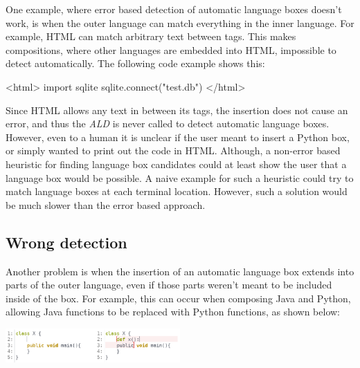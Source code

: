 \documentclass[sigplan,screen]{acmart}\settopmatter{printfolios=true,printccs=false,printacmref=false}
\newcommand{\ald}[0]{\emph{ALD}\xspace}
\begin{document}
One example, where error based detection of automatic language boxes doesn't
work, is when the outer language can match everything in the inner language.
For example, HTML can match arbitrary text between tags. This makes
compositions, where other languages are embedded into HTML, impossible to
detect automatically. The following code example shows this:

\begin{lstdefault}[language=html]
<html>
import sqlite
sqlite.connect("test.db")
</html>
\end{lstdefault}
\vspace{1em}

Since HTML allows any text in between its tags, the insertion does not cause an
error, and thus the \ald is never called to detect automatic language boxes.
However, even to a human it is unclear if the user meant to insert a Python
box, or simply wanted to print out the code in HTML. Although, a non-error
based heuristic for finding language box candidates could at least show the
user that a language box would be possible.  A naive example for such a
heuristic could try to match language boxes at each terminal location. However,
such a solution would be much slower than the error based approach.

\subsection{Wrong detection}

Another problem is when the insertion of an automatic language box extends into
parts of the outer language, even if those parts weren't meant to be included
inside of the box. For example, this can occur when composing Java and Python,
allowing Java functions to be replaced with Python functions, as shown below:

\begin{center}
\includegraphics[width=0.50\textwidth]{images/autobox_limitjavapy.png}
\end{center}
\end{document}
